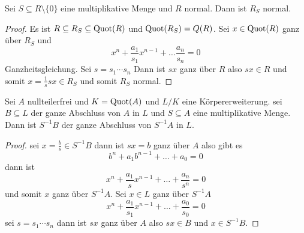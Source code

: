 \begin{Lemma}
    Sei \(S\subseteq R\setminus\{0\}\) eine multiplikative Menge und \(R\) normal. Dann ist \(R_S\) normal.
\end{Lemma}
\begin{proof}
    Es ist \(R\subseteq R_S\subseteq \operatorname{Quot}(R)\) und \(\operatorname{Quot}(R_S)=Q(R)\).
    Sei \(x\in \operatorname{Quot}(R)\) ganz über \(R_S\) und \[x^n+\frac{a_1}{s_1}x^{n-1}+\dots \frac{a_n}{s_n}=0\] Ganzheitsgleichung. Sei \(s=s_1\cdots s_n\)
    Dann ist \(sx\) ganz über \(R\) also \(sx\in R\) und somit \(x=\frac 1 s sx\in R_S\) und somit \(R_S\) normal.
\end{proof}
\begin{Lemma}
    Sei \(A\) nullteilerfrei und \(K=\operatorname{Quot}(A)\) und \(L/K\) eine Körpererweiterung. sei \(B\subseteq L\) der ganze Abschluss von \(A\) in \(L\) und \(S\subseteq A\) eine multiplikative Menge. Dann ist \(S^{-1}B\) der ganze Abschluss von \(S^{-1}A\) in \(L\).
\end{Lemma}
\begin{proof}
    sei \(x=\frac bs \in S^{-1}B\) dann ist \(sx=b\) ganz über \(A\) also gibt es \[b^n+a_1b^{n-1}+\dots+a_0=0\] dann ist \[x^n+\frac{a_1}{s}x^{n-1}+\dots+\frac{a_n}{s^n}=0\] und somit \(x\) ganz über \(S^{-1}A\).
    Sei \(x\in L\) ganz über \(S^{-1}A\)
    \[x^n+\frac{a_1}{s_1}x^{n-1}+\dots+\frac{a_0}{s_0}=0\] sei \(s=s_1\cdots s_n\) dann ist \(sx\) ganz über \(A\) also \(sx\in B\) und \(x\in S^{-1}B\).
\end{proof}

